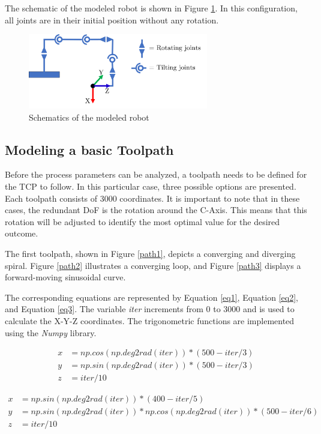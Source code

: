The schematic of the modeled robot is shown in Figure \ref{schema}. In this configuration, all joints are in their initial position without any rotation.
\begin{figure}[H]
	\centerline{\includegraphics[width=0.7\textwidth]{figures/schema.png}}
	\caption{Schematics of the modeled robot}
	\label{schema}
\end{figure}

\subsection{Modeling a basic Toolpath}\label{MBT}
Before the process parameters can be analyzed, a toolpath needs to be defined for the TCP to follow. In this particular case, three possible options are presented. Each toolpath consists of 3000 coordinates. It is important to note that in these cases, the redundant DoF is the rotation around the C-Axis. This means that  this rotation will be adjusted to identify the most optimal value for the desired outcome.


The first toolpath, shown in Figure \ref{path1}, depicts a converging and diverging spiral. Figure \ref{path2} illustrates a converging loop, and Figure \ref{path3} displays a forward-moving sinusoidal curve. 

The corresponding equations are represented by Equation \ref{eq1}, Equation \ref{eq2}, and Equation \ref{eq3}. The variable \textit{iter} increments from 0 to 3000 and is used to calculate the X-Y-Z coordinates. The trigonometric functions are implemented using the \textit{Numpy} library.


\begin{equation}\label{eq1}
\begin{split}
x &= np.cos(np.deg2rad(iter)) * (500 - iter / 3)\\
y &= np.sin(np.deg2rad(iter)) * (500 - iter / 3)\\
z &= iter / 10
\end{split}
\end{equation}


\begin{equation}\label{eq2}
\begin{split}
x &= np.sin(np.deg2rad(iter)) * (400-iter / 5)\\
y &= np.sin(np.deg2rad(iter)) * np.cos(np.deg2rad(iter)) * (500-iter / 6)\\
z &= iter / 10
\end{split}
\end{equation}

